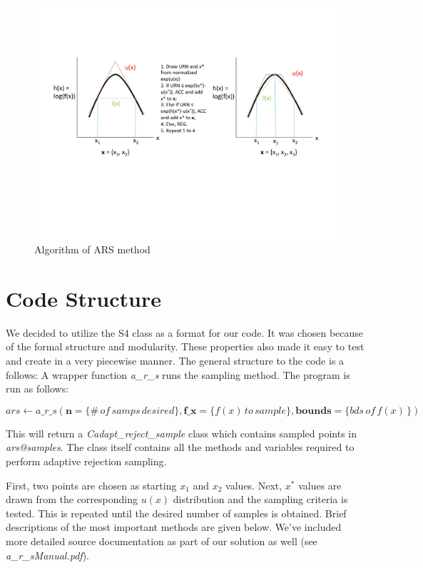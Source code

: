 \documentclass[11pt, oneside]{article}   	%
\begin{document}
\begin{figure}[htbp!]
  \centering
  \caption{ Algorithm of ARS method}
    \includegraphics[width=.93\textwidth]{algorithm}
\end{figure}



\section{Code Structure}

We decided to utilize the S4 class as a format for our code.  It was chosen because of the formal structure and modularity.  These properties also made it easy to test and create in a very piecewise manner.  The general structure to the code is a follows:  A wrapper function \textit{a\_r\_s} runs the sampling method.  The program is run as follows:

 $$ ars \leftarrow a\_r\_s( \mathbf{n}=\{\# \, of \, samps \, desired \}, \mathbf{f\_x} = \{f(x) \, to \, sample\}, \mathbf{bounds}= \{ bds \, of \, f(x)\, \} ) $$
 
 This will return a \textit{Cadapt\_reject\_sample} class which contains sampled points in \textit{ars@samples}.  The class itself contains all the methods and variables required to perform adaptive rejection sampling.  
 
 First, two points are chosen as starting $x_1$ and $x_2$ values.  Next, $x^*$ values are drawn from the corresponding $u(x)$ distribution and the sampling criteria is tested.  This is repeated until the desired number of samples is obtained.    Brief descriptions of the most important methods are given below.  We've included more detailed source documentation as part of our solution as well (see \textit{a\_r\_sManual.pdf}).
\end{document}

